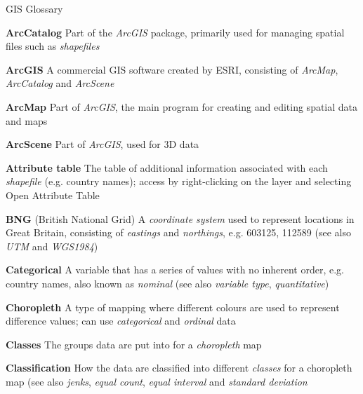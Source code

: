 \documentclass[a4paper,10pt]{article}
\begin{document}

\begin{center}

{\huge GIS Glossary}


\end{center}

\begin{multicols}{2}


\textbf{ArcCatalog} Part of the \textit{ArcGIS} package, primarily used for managing spatial files such as \textit{shapefiles} %

\textbf{ArcGIS} A commercial GIS software created by ESRI, consisting of \textit{ArcMap}, \textit{ArcCatalog} and \textit{ArcScene} 

\textbf{ArcMap} Part of \textit{ArcGIS}, the main program for creating and editing spatial data and maps

\textbf{ArcScene} Part of \textit{ArcGIS}, used for 3D data 

\textbf{Attribute table} The table of additional information associated with each \textit{shapefile} (e.g. country names); access by right-clicking on the layer and selecting Open Attribute Table 

\textbf{BNG} (British National Grid) A \textit{coordinate system} used to represent locations in Great Britain, consisting of \textit{eastings} and \textit{northings}, e.g. 603125, 112589 (see also \textit{UTM} and \textit{WGS1984}) 

\textbf{Categorical} A variable that has a series of values with no inherent order, e.g. country names, also known as \textit{nominal} (see also \textit{variable type}, \textit{quantitative}) 

\textbf{Choropleth} A type of mapping where different colours are used to represent difference values; can use \textit{categorical} and \textit{ordinal} data

\textbf{Classes} The groups data are put into for a \textit{choropleth} map

\textbf{Classification} How the data are classified into different \textit{classes} for a choropleth map (see also \textit{jenks}, \textit{equal count}, \textit{equal interval} and \textit{standard deviation}


\end{multicols}
\end{document}
